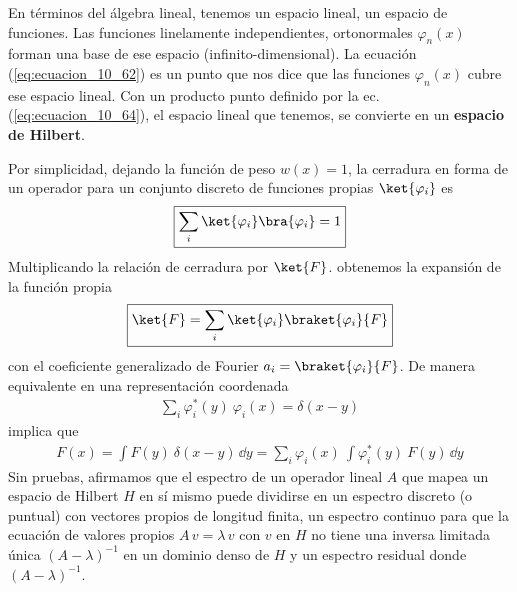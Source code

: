 \par
En términos del álgebra lineal, tenemos un espacio lineal, un espacio de funciones. Las funciones linelamente independientes, ortonormales $\varphi_{n}(x)$ forman una base de ese espacio (infinito-dimensional). La ecuación (\ref{eq:ecuacion_10_62}) es un punto que nos dice que las funciones $\varphi_{n}(x)$ cubre ese espacio lineal. Con un producto punto definido por la ec. (\ref{eq:ecuacion_10_64}), el espacio lineal que tenemos, se convierte en un \textbf{espacio de Hilbert}.
\par
Por simplicidad, dejando la función de peso $w(x)=1$, la cerradura en forma de un operador para un conjunto discreto de funciones propias $\ket{\varphi_{i}}$ es
\begin{align*}
\boxed{\sum_{i} \ket{\varphi_{i}} \bra{\varphi_{i}} =  1}
\end{align*}
Multiplicando la relación de cerradura por $\ket{F}$. obtenemos la expansión de la función propia
\begin{align*}
\boxed{\ket{F} = \sum_{i} \ket{\varphi_{i}} \braket{\varphi_{i}}{F}}
\end{align*}
con el coeficiente generalizado de Fourier $a_{i} = \braket{\varphi_{i}}{F}$. De manera equivalente en una representación coordenada
\begin{align*}
\boxed{\sum_{i} \varphi_{i}^{*} (y) \: \varphi_{i} (x) = \delta (x - y)}
\end{align*}
implica que
\begin{align*}
F(x) = \int F(y) \: \delta (x - y) \, \dd{y} = \sum_{i} \varphi_{i} (x) \: \int \varphi_{i}^{*} (y) \: F(y) \, \dd{y}
\end{align*}
Sin pruebas, afirmamos que el espectro de un operador lineal $A$ que mapea un espacio de Hilbert $H$ en sí mismo puede dividirse en un espectro discreto (o puntual) con vectores propios de longitud finita, un espectro continuo para que la ecuación de valores propios $A \, v = \lambda \, v$ con $v$ en $H$ no tiene una inversa limitada única $(A - \lambda)^{-1}$ en un dominio denso de $H$ y un espectro residual donde $(A - \lambda)^{-1}$.
